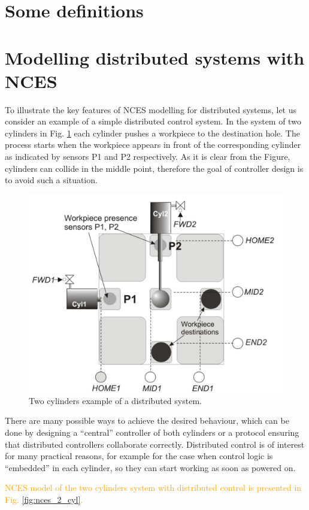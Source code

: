 \documentclass[runningheads]{llncs}
\newcommand{\VV}[1]{\textcolor{orange}{#1}}
\begin{document}
\section{Some definitions}\label{sec:def}



\section{Modelling distributed systems with NCES}\label{sec:ncesmod}

To illustrate the key features of NCES modelling for distributed systems, let us consider an example of a simple distributed control system. In the system of two cylinders in Fig. \ref{fig:two_cylinders} each cylinder pushes a workpiece to the destination hole. The process starts when the workpiece appears in front of the corresponding cylinder as indicated by sensors P1 and P2 respectively. 
As it is clear from the Figure, cylinders can collide in the middle point, therefore the goal of controller design is to avoid such a situation. 


\begin {figure}
    \centering
    \includegraphics [width = .5 \textwidth] {images/two_cylinders.jpg}
    \caption {Two cylinders example of a distributed system.}
    \label {fig:two_cylinders}
\end {figure}

There are many possible ways to achieve the desired behaviour, which can be done by designing a “central” controller of both cylinders or a protocol ensuring that distributed controllers collaborate correctly. Distributed control is of interest for many practical reasons, for example for the case when control logic is “embedded” in each cylinder, so they can start working as soon as powered on.

\VV{NCES model of the two cylinders system with distributed control is presented in Fig. \ref{fig:nces_2_cyl}.}
\end{document}
